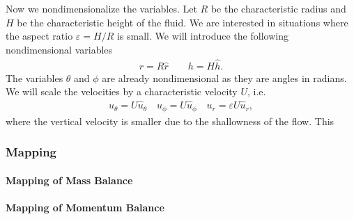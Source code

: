   Now we nondimensionalize the variables.
  Let \(R\) be the characteristic radius and \(H\) be the characteristic height of the
  fluid.
  We are interested in situations where the aspect ratio \(\varepsilon = H/R\) is small.
  We will introduce the following nondimensional variables
  \begin{gather}
    r = R \hat{r} \qquad h = H \hat{h}.
  \end{gather}
  The variables \(\theta \) and \(\phi \) are already nondimensional as they are angles
  in radians.
  We will scale the velocities by a characteristic velocity \(U\), i.e.
  \begin{gather}
    u_{\theta} = U \hat{u}_{\theta} \quad u_{\phi} = U \hat{u}_{\phi}
    \quad u_r = \varepsilon U \hat{u}_r,
  \end{gather}
  where the vertical velocity is smaller due to the shallowness of the flow.
  This 



\subsubsection{Mapping}

\paragraph{Mapping of Mass Balance}

\paragraph{Mapping of Momentum Balance}




%
%

